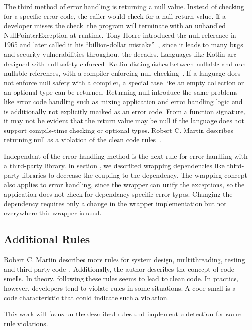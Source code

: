 The third method of error handling is returning a null value. Instead of checking for a specific error code, the caller would check for a null return value. If a developer misses the check, the program will terminate with an unhandled NullPointerException at runtime. Tony Hoare introduced the null reference in 1965 and later called it his \enquote{billion-dollar mistake}~\cite{hoare_null_2009}, since it leads to many bugs and security vulnerabilities throughout the decades. Languages like Kotlin are designed with null safety enforced. Kotlin distinguishes between nullable and non-nullable references, with a compiler enforcing null checking~\cite{noauthor_null_nodate}. If a language does not enforce null safety with a compiler, a special case like an empty collection or an optional type can be returned. 
Returning null introduce the same problems like error code handling such as mixing application and error handling logic and is additionally not explicitly marked as an error code. From a function signature, it may not be evident that the return value may be null if the language does not support compile-time checking or optional types. Robert C. Martin describes returning null as a violation of the clean code rules~\cite{martin_clean_2009}. 

Independent of the error handling method is the next rule for error handling with a third-party library. In section , we described wrapping dependencies like third-party libraries to decrease the coupling to the dependency. The wrapping concept also applies to error handling, since the wrapper can unify the exceptions, so the application does not check for dependency-specific error types. Changing the dependency requires only a change in the wrapper implementation but not everywhere this wrapper is used. 

\subsection{Additional Rules}
Robert C. Martin describes more rules for system design, multithreading, testing and third-party code~\cite{martin_clean_2009}. 
Additionally, the author describes the concept of code smells. In theory, following these rules seems to lead to clean code. In practice, however, developers tend to violate rules in some situations. A code smell is a code characteristic that could indicate such a violation.

This work will focus on the described rules and implement a detection for some rule violations.

